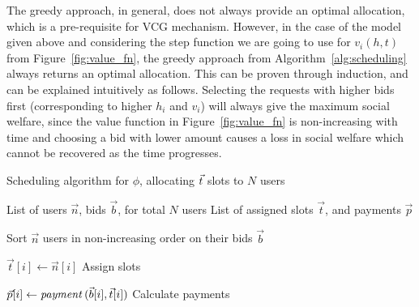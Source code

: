 The greedy approach, in general, does not always provide an optimal allocation, which is a pre-requisite for VCG mechanism.
However, in the case of the model given above and considering the step function we are going to use for $v_i(h, t)$ from Figure~\ref{fig:value_fn}, the greedy approach from Algorithm~\ref{alg:scheduling} always returns an optimal allocation. 
This can be proven through induction, and can be explained intuitively as follows.
Selecting the requests with higher bids first (corresponding to higher $h_i$ and $v_i$) will always give the maximum social welfare,
since the value function in Figure~\ref{fig:value_fn} is non-increasing with time and choosing a bid with lower amount causes a loss in social welfare which cannot be recovered as the time progresses. 


\begin{algorithm}[tbp]
	\caption{Scheduling algorithm for $\phi$, allocating $\protect\vec{t}$ slots to $N$ users}
	\label{alg:scheduling}
	\small
	
\begin{algorithmic}[1]
\Require List of users  $\vec{n}$, bids  $\vec{b}$, for total $N$ users
\Ensure List of assigned slots $\vec{t}$, and payments $\vec{p}$ 

\State Sort  $\vec{n}$ users in non-increasing order on their bids  $\vec{b}$

	\State $ \vec{t}[i] \gets \vec{n}[i]$
	\Comment Assign slots
\EndFor

	\State $ \vec{p}[i] \gets \text{\emph{payment}}\,(\vec{b}[i],
	\vec{t}[i])$
	\Comment Calculate payments
\EndFor

\end{algorithmic}

\end{algorithm}
